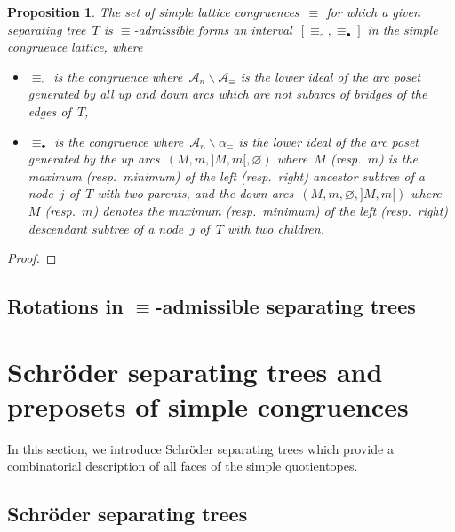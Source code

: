 \documentclass{amsart}
\newtheorem{proposition}[theorem]{Proposition}
\theoremstyle{definition}
\newcommand{\ssm}{\smallsetminus} %
\newcommand{\vincent}[1]{\todo[color=blue!30]{#1 \\ \hfill --- V.}}
\newcommand{\arc}{\alpha} %
\newcommand{\arcs}{{\mathcal{A}}} %
\begin{document}
\begin{proposition}
\label{prop:whichCongruences}
The set of simple lattice congruences~$\equiv$ for which a given separating tree~$T$ is $\equiv$-admissible forms an interval~$[\equiv_\circ, \equiv_\bullet]$ in the simple congruence lattice, where
\begin{itemize}
\item $\equiv_\circ$ is the congruence where~$\arcs_n \ssm \arcs_\equiv$ is the lower ideal of the arc poset generated by all up and down arcs which are not subarcs of bridges of the edges of~$T$,
\item $\equiv_\bullet$ is the congruence where~$\arcs_n \ssm \arc_\equiv$ is the lower ideal of the arc poset generated by the up arcs~$(M, m, {]M,m[}, \varnothing)$ where~$M$ (resp.~$m$) is the maximum (resp.~minimum) of the left (resp.~right) ancestor subtree of a node~$j$ of~$T$ with two parents, and the down arcs~$(M, m, \varnothing, {]M,m[})$ where~$M$ (resp.~$m$) denotes the maximum (resp.~minimum) of the left (resp.~right) descendant subtree of a node~$j$ of~$T$ with two children.
\end{itemize}
\end{proposition}

\begin{proof}
\vincent{todo}
\end{proof}


\subsection{Rotations in $\equiv$-admissible separating trees}

\vincent{todo}


\section{Schröder separating trees and preposets of simple congruences}
\label{sec:SchroderSeparatingTreesPreposetsSimpleCongruences}

In this section, we introduce Schröder separating trees which provide a combinatorial description of all faces of the simple quotientopes.


\subsection{Schröder separating trees}
\label{subsec:SchroderSeparatingTrees}
\end{document}

